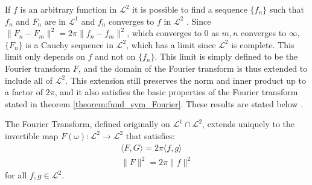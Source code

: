 If $f$ is an arbitrary function in $\mathcal{L}^2$ it is possible to find a sequence $\{f_n\}$ such that $f_n$ and $F_n$ are in $\mathcal{L}^1$ and $f_n$ converges to $f$ in $\mathcal{L}^2$ \cite{page 82, FAA}. Since $\|F_n - F_m\|^2 = 2\pi\|f_n - f_m\|^2$, which converges to 0 as $m,n$ converges to $\infty$, $\{F_n\}$ is a Cauchy sequence in $\mathcal{L}^2$, which has a limit since $\mathcal{L}^2$ is complete. This limit only depends on $f$ and not on $\{f_n\}$. This limit is simply defined to be the Fourier transform $F$, and the domain of the Fourier transform is thus extended to include all of $\mathcal{L}^2$. This extension still preserves the norm and inner product up to a factor of $2\pi$, and it also satisfies the basic properties of the Fourier transform stated in theorem \ref{theorem:fund_sym_Fourier}. These results are stated below \cite{page 222, FAA}.

\begin{theorem} \label{Plancherel}
The Fourier Transform, defined originally on $\mathcal{L}^1 \cap \mathcal{L}^2$, extends uniquely to the invertible map $F(\omega): \mathcal{L}^2 \to \mathcal{L}^2$ that satisfies:
\begin{align*}
\langle F, G \rangle = 2\pi \langle f,g \rangle \\
\|F\|^2  = 2\pi \|f\|^2
\end{align*}
for all $f,g \in \mathcal{L}^2$.
\end{theorem}